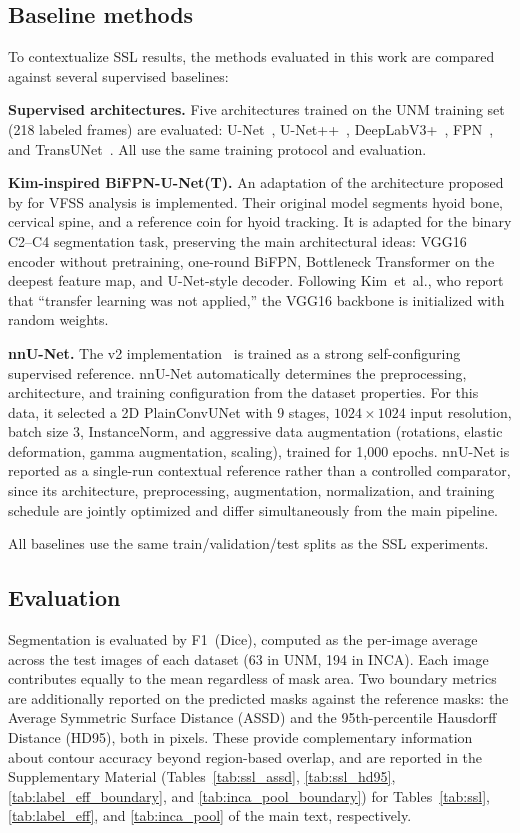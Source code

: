 \documentclass[a4paper,fleqn]{cas-dc}
\begin{document}
\subsection{Baseline methods}
\label{subsec:baselines}

To contextualize SSL results, the methods evaluated in this work are compared against several supervised baselines:

\textbf{Supervised architectures.}
Five architectures trained on the UNM training set (218 labeled frames) are evaluated: U-Net~\citep{ref_unet}, U-Net++~\citep{ref_unetpp}, DeepLabV3+~\citep{ref_deeplabv3plus}, FPN~\citep{ref_fpn}, and TransUNet~\citep{ref_transunet}.
All use the same training protocol and evaluation.

\textbf{Kim-inspired BiFPN-U-Net(T).}
An adaptation of the architecture proposed by \citet{ref_kim2021} for VFSS analysis is implemented.
Their original model segments hyoid bone, cervical spine, and a reference coin for hyoid tracking.
It is adapted for the binary C2--C4 segmentation task, preserving the main architectural ideas: VGG16 encoder without pretraining, one-round BiFPN, Bottleneck Transformer on the deepest feature map, and U-Net-style decoder.
Following Kim~et~al., who report that ``transfer learning was not applied,'' the VGG16 backbone is initialized with random weights.

\textbf{nnU-Net.}
The v2 implementation~\citep{ref_nnunet} is trained as a strong self-configuring supervised reference.
nnU-Net automatically determines the preprocessing, architecture, and training configuration from the dataset properties.
For this data, it selected a 2D PlainConvUNet with 9 stages, $1024{\times}1024$ input resolution, batch size 3, InstanceNorm, and aggressive data augmentation (rotations, elastic deformation, gamma augmentation, scaling), trained for 1{,}000 epochs.
nnU-Net is reported as a single-run contextual reference rather than a controlled comparator, since its architecture, preprocessing, augmentation, normalization, and training schedule are jointly optimized and differ simultaneously from the main pipeline.

All baselines use the same train/validation/test splits as the SSL experiments.

\subsection{Evaluation}

Segmentation is evaluated by F1~(Dice), computed as the per-image average across the test images of each dataset (63 in UNM, 194 in INCA). Each image contributes equally to the mean regardless of mask area.
Two boundary metrics are additionally reported on the predicted masks against the reference masks: the Average Symmetric Surface Distance (ASSD) and the 95th-percentile Hausdorff Distance (HD95), both in pixels. These provide complementary information about contour accuracy beyond region-based overlap, and are reported in the Supplementary Material (Tables~\ref{tab:ssl_assd}, \ref{tab:ssl_hd95}, \ref{tab:label_eff_boundary}, and \ref{tab:inca_pool_boundary}) for Tables~\ref{tab:ssl}, \ref{tab:label_eff}, and \ref{tab:inca_pool} of the main text, respectively.
\end{document}
